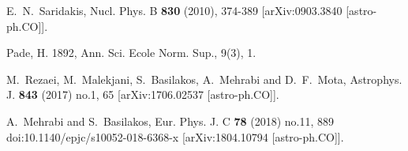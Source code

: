 \documentclass[aps,prd,amsmath,amssymb]{revtex4}
\begin{document}
\begin{thebibliography}{99}
 E.~N.~Saridakis,
Nucl. Phys. B \textbf{830} (2010), 374-389
[arXiv:0903.3840 [astro-ph.CO]].

 Pade, H. 1892, Ann. Sci. Ecole Norm. Sup., 9(3), 1.

 M.~Rezaei, M.~Malekjani, S.~Basilakos, A.~Mehrabi and D.~F.~Mota,
Astrophys. J. \textbf{843} (2017) no.1, 65
[arXiv:1706.02537 [astro-ph.CO]].

 A.~Mehrabi and S.~Basilakos,
Eur. Phys. J. C \textbf{78} (2018) no.11, 889
doi:10.1140/epjc/s10052-018-6368-x
[arXiv:1804.10794 [astro-ph.CO]].
%
\end{thebibliography}
\end{document}
